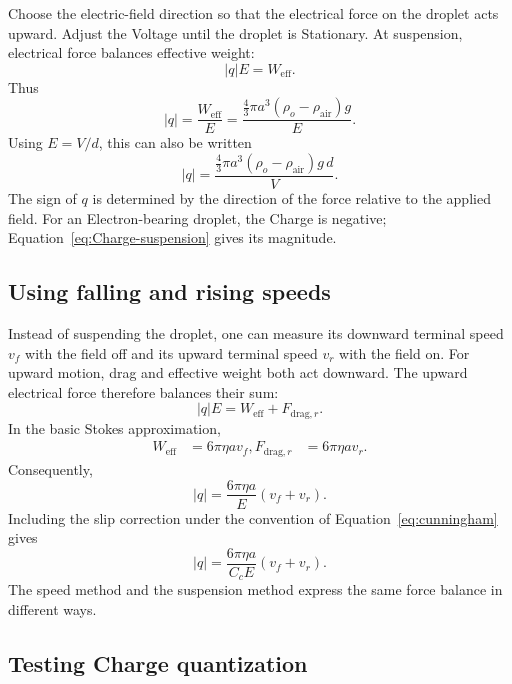 \documentclass[a4paper, 10pt, onepage]{elegantbook}
\begin{document}
{Choose the electric-field direction so that the electrical force on
the droplet acts upward. Adjust the Voltage until the droplet is
Stationary. At suspension, electrical force balances effective weight:
\begin{equation}
|q|E=W_{\mathrm{eff}}.
\end{equation}
Thus
\begin{equation}
|q|=\frac{W_{\mathrm{eff}}}{E}
=\frac{
\frac{4}{3}\pi a^3(\rho_o-\rho_{\mathrm{air}})g
}{E}.
\label{eq:Charge-suspension}
\end{equation}
Using \(E=V/d\), this can also be written
\begin{equation}
|q|=
\frac{
\frac{4}{3}\pi a^3(\rho_o-\rho_{\mathrm{air}})g\,d
}{V}.
\end{equation}
The sign of \(q\) is determined by the direction of the force relative
to the applied field. For an Electron-bearing droplet, the Charge is
negative; Equation~\eqref{eq:Charge-suspension} gives its magnitude.

\subsection{Using falling and rising speeds}

Instead of suspending the droplet, one can measure its downward
terminal speed \(v_f\) with the field off and its upward terminal
speed \(v_r\) with the field on. For upward motion, drag and effective
weight both act downward. The upward electrical force therefore
balances their sum:
\begin{equation}
|q|E=W_{\mathrm{eff}}+F_{\mathrm{drag},r}.
\end{equation}
In the basic Stokes approximation,
\begin{align}
W_{\mathrm{eff}}&=6\pi\eta a v_f,
F_{\mathrm{drag},r}&=6\pi\eta a v_r.
\end{align}
Consequently,
\begin{equation}
|q|=\frac{6\pi\eta a}{E}(v_f+v_r).
\label{eq:Charge-speeds}
\end{equation}
Including the slip correction under the convention of
Equation~\eqref{eq:cunningham} gives
\begin{equation}
|q|=\frac{6\pi\eta a}{C_c E}(v_f+v_r).
\label{eq:Charge-speeds-corrected}
\end{equation}
The speed method and the suspension method express the same force
balance in different ways.

\subsection{Testing Charge quantization}

}
\end{document}
